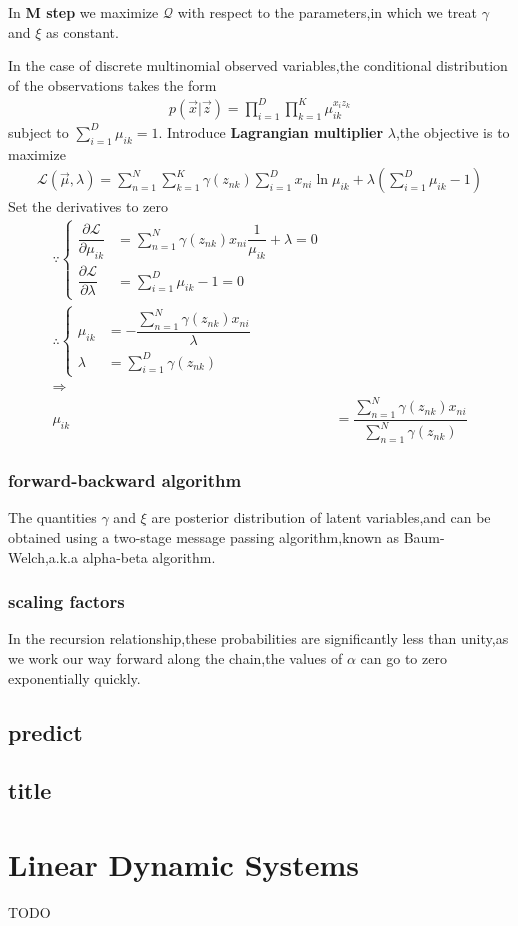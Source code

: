 In \textbf{M step} we maximize $\mathcal{Q}$ with respect to the parameters,in which we treat $\gamma$ and $\xi$ as constant.

In the case of discrete multinomial observed variables,the conditional distribution of the observations takes the form
\begin{align}
	p(\vec{x}|\vec{z})=\prod_{i=1}^{D}\prod_{k=1}^{K}\mu_{ik}^{x_i z_k}
\end{align}
subject to $\sum_{i=1}^{D}\mu_{ik}=1$.
	Introduce \textbf{Lagrangian multiplier} $\lambda$,the objective is to maximize
	\begin{align}
	\mathcal{L}(\vec{\mu},\lambda) = \sum_{n=1}^{N}\sum_{k=1}^{K}\gamma(z_{nk})\sum_{i=1}^{D}x_{ni}\ln\mu_{ik}+\lambda(\sum_{i=1}^{D}\mu_{ik}-1)
	\end{align}
	Set the derivatives to zero
	\begin{align}
	\because\begin{cases}
	\dfrac{\partial\mathcal{L}}{\partial \mu_{ik}} &= \sum_{n=1}^{N}\gamma(z_{nk})x_{ni}\dfrac{1}{\mu_{ik}} + \lambda = 0\\
	\dfrac{\partial\mathcal{L}}{\partial \lambda} &= \sum_{i=1}^{D}\mu_{ik} -1 = 0
	\end{cases}\\
	\therefore
	\begin{cases}
	\mu_{ik}&=-\dfrac{\sum_{n=1}^{N}\gamma(z_{nk})x_{ni}}{\lambda} \\
	\lambda &= \sum_{i=1}^{D}\gamma(z_{nk})
	\end{cases}\\
	\Longrightarrow \\
	\mu_{ik}&=\dfrac{\sum_{n=1}^{N}\gamma(z_{nk})x_{ni}}{\sum_{n=1}^{N}\gamma(z_{nk})}
	\end{align}
\subsubsection{forward-backward algorithm}
	The quantities $\gamma$ and $\xi$ are posterior distribution of latent variables,and can be obtained using a two-stage message passing algorithm,known as Baum-Welch,a.k.a alpha-beta algorithm.


\subsubsection{scaling factors}
	In the recursion relationship,these probabilities are significantly less than unity,as we work our way forward along the chain,the values of $\alpha$ can go to zero exponentially quickly.

\subsection{predict}

\subsection{title}


\section{Linear Dynamic Systems}
TODO